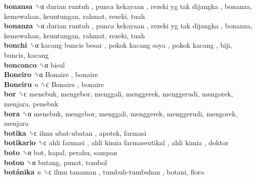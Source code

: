 \textbf{bonansa} ␝α   durian runtuh ,  punca kekayaan ,  rezeki yg tak dijangka , bonanza, kemewahan, keuntungan, rahmat, rezeki, tuah  \\
\textbf{bonanza} ␝α   durian runtuh ,  punca kekayaan ,  rezeki yg tak dijangka , bonanza, kemewahan, keuntungan, rahmat, rezeki, tuah  \\
\textbf{bonchi} ␝α   kacang buncis besar ,  pokok kacang soya ,  pokok kacang , biji, buncis, kacang  \\
\textbf{bonconco} ␝α  bisul  \\
\textbf{Boneiro} ␝α   Bonaire , bonaire  \\
\textbf{Boneiru} \emph{n}  ␝ϲ   Bonaire , bonaire  \\
\textbf{bor} ␝ϲ  menebuk, mengebor, menggali, menggerek, menggerudi, mengorek, menjara, penebuk  \\
\textbf{bora} ␝α  menebuk, mengebor, menggali, menggerek, menggerudi, mengorek, menjara  \\
\textbf{botika} ␝ϲ   ilmu ubat-ubatan , apotek, farmasi  \\
\textbf{botikario} ␝ϲ   ahli farmasi ,  ahli kimia farmaseutikal ,  ahli kimia , doktor  \\
\textbf{boto} ␝α  bot, kapal, perahu, sampan  \\
\textbf{boton} ␝α  butang, punat, tombol  \\
\textbf{botánika} \emph{n}  ␝ϲ   ilmu tanaman ,  tumbuh-tumbuhan , botani, flora  \\

